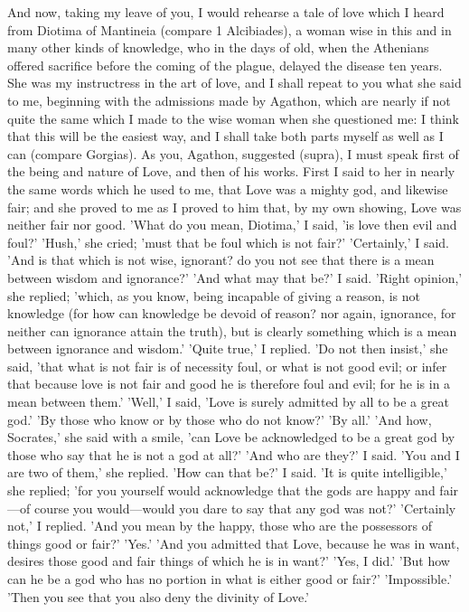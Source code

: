 \documentclass[11pt,letter]{article}
\begin{document}
\par  And now, taking my leave of you, I would rehearse a tale of love which I heard from Diotima of Mantineia (compare 1 Alcibiades), a woman wise in this and in many other kinds of knowledge, who in the days of old, when the Athenians offered sacrifice before the coming of the plague, delayed the disease ten years. She was my instructress in the art of love, and I shall repeat to you what she said to me, beginning with the admissions made by Agathon, which are nearly if not quite the same which I made to the wise woman when she questioned me: I think that this will be the easiest way, and I shall take both parts myself as well as I can (compare Gorgias). As you, Agathon, suggested (supra), I must speak first of the being and nature of Love, and then of his works. First I said to her in nearly the same words which he used to me, that Love was a mighty god, and likewise fair; and she proved to me as I proved to him that, by my own showing, Love was neither fair nor good. 'What do you mean, Diotima,' I said, 'is love then evil and foul?' 'Hush,' she cried; 'must that be foul which is not fair?' 'Certainly,' I said. 'And is that which is not wise, ignorant? do you not see that there is a mean between wisdom and ignorance?' 'And what may that be?' I said. 'Right opinion,' she replied; 'which, as you know, being incapable of giving a reason, is not knowledge (for how can knowledge be devoid of reason? nor again, ignorance, for neither can ignorance attain the truth), but is clearly something which is a mean between ignorance and wisdom.' 'Quite true,' I replied. 'Do not then insist,' she said, 'that what is not fair is of necessity foul, or what is not good evil; or infer that because love is not fair and good he is therefore foul and evil; for he is in a mean between them.' 'Well,' I said, 'Love is surely admitted by all to be a great god.' 'By those who know or by those who do not know?' 'By all.' 'And how, Socrates,' she said with a smile, 'can Love be acknowledged to be a great god by those who say that he is not a god at all?' 'And who are they?' I said. 'You and I are two of them,' she replied. 'How can that be?' I said. 'It is quite intelligible,' she replied; 'for you yourself would acknowledge that the gods are happy and fair—of course you would—would you dare to say that any god was not?' 'Certainly not,' I replied. 'And you mean by the happy, those who are the possessors of things good or fair?' 'Yes.' 'And you admitted that Love, because he was in want, desires those good and fair things of which he is in want?' 'Yes, I did.' 'But how can he be a god who has no portion in what is either good or fair?' 'Impossible.' 'Then you see that you also deny the divinity of Love.'
\end{document}
